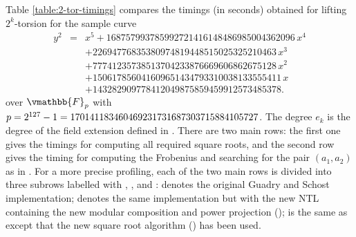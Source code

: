 Table \ref{table:2-tor-timings} compares the timings (in seconds) obtained for lifting $2^k$-torsion 
for the sample curve 
\[
\begin{array}{rcl}
y^2 &=& 
x^5 + 168757993785992721416148486985004362096\, x^4 \\
&& + 22694776835380974819448515025325210463\, x^3 \\
&& + 77741235738513704233876669606862675128\, x^2 \\
&& + 150617856041609651434793310038133555411\, x\\
&& + 143282909778412049875859459912573485378.
\end{array}
\]
over $\vmathbb{F}_p$ with $p = 2^{127} - 1 = \seqsplit{170141183460469231731687303715884105727}$. The 
degree $e_k$ is the degree of the field extension defined in . 
There are two main rows: the first one gives the timings for computing all required square roots, 
and the second row gives the timing for computing the Frobenius and searching for the pair $(a_1, 
a_2)$ as in . For a more precise profiling, each of the two 
main rows is divided into three subrows labelled with , , and : 
 denotes the original Guadry and Schost implementation;  denotes the same 
implementation but with the new NTL containing the new modular composition and power projection 
();  is the same as  except that the new square root 
algorithm () has been used.
